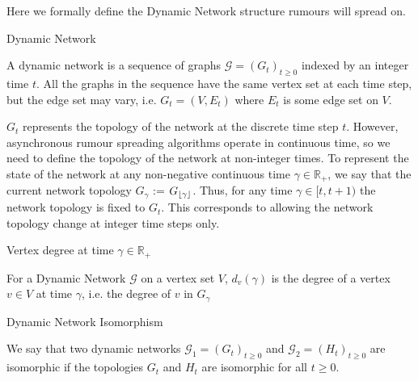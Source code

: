 Here we formally define the Dynamic Network structure rumours will spread on.

\begin{definition}
	Dynamic Network

	\noindent
	A dynamic network is a sequence of graphs $\mathcal{G} = (G_t)_{t \geq 0}$ indexed by an integer time $t$. All the graphs in the sequence have the same vertex set at each time step, but the edge set may vary, i.e.  $G_t = (V, E_t)$ where $E_t$ is some edge set on $V$.
\end{definition}

$G_t$ represents the topology of the network at the discrete time step $t$. However, asynchronous rumour spreading algorithms operate in continuous time, so we need to define the topology of the network at non-integer times. To represent the state of the network at any non-negative continuous time $\gamma \in \mathbb{R}_+$, we say that the current network topology $G_\gamma$ := $G_{\lfloor\gamma\rfloor}$. Thus, for any time $\gamma \in [t, t + 1)$ the network topology is fixed to $G_t$. This corresponds to allowing the network topology change at integer time steps only.


\begin{definition}
	Vertex degree at time $\gamma \in \mathbb{R}_+ $ 

	\noindent
	For a Dynamic Network $\mathcal{G}$ on a vertex set $V$, $d_v(\gamma)$ is the degree of a vertex $v \in V$ at time $\gamma$, i.e. the degree of $v$ in $G_\gamma$
\end{definition}

\begin{definition}
	Dynamic Network Isomorphism

	We say that two dynamic networks $\mathcal{G}_1 = (G_t)_{t \geq 0}$ and $\mathcal{G}_2 = (H_t)_{t \geq 0}$ are isomorphic if the topologies $G_t$ and $H_t$ are isomorphic for all $t \geq 0$. 
\end{definition}



